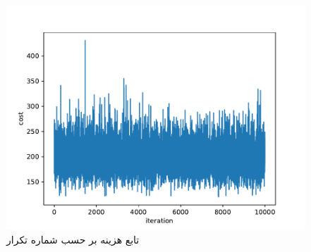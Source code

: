 \begin{figure}[H]
	\caption{تابع هزینه بر حسب شماره تکرار} 
	\centering 
	\includegraphics[width=12cm]{../Figure/Q2/tabu} 
\end{figure}
